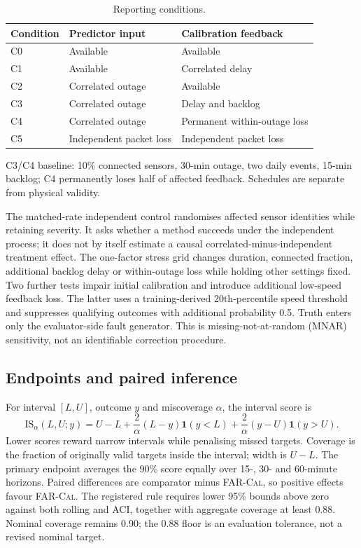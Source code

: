 \documentclass[pdflatex,sn-mathphys-num]{sn-jnl}
\newcommand{\FAR}{\textsc{FAR-Cal}}
\begin{document}
\begin{table}[!htbp]
\caption{Reporting conditions.}\label{tab:conditions}
\centering\setlength{\tabcolsep}{3pt}\small
\begin{tabular}{lll}\toprule
Condition & Predictor input & Calibration feedback \\\midrule
C0 & Available & Available \\
C1 & Available & Correlated delay \\
C2 & Correlated outage & Available \\
C3 & Correlated outage & Delay and backlog \\
C4 & Correlated outage & Permanent within-outage loss \\
C5 & Independent packet loss & Independent packet loss \\
\bottomrule\end{tabular}
\par\smallskip\footnotesize C3/C4 baseline: 10\% connected sensors, 30-min outage, two daily events, 15-min backlog; C4 permanently loses half of affected feedback. Schedules are separate from physical validity.
\end{table}
\FloatBarrier

The matched-rate independent control randomises affected sensor identities while retaining severity. It asks whether a method succeeds under the independent process; it does not by itself estimate a causal correlated-minus-independent treatment effect. The one-factor stress grid changes duration, connected fraction, additional backlog delay or within-outage loss while holding other settings fixed. Two further tests impair initial calibration and introduce additional low-speed feedback loss. The latter uses a training-derived 20th-percentile speed threshold and suppresses qualifying outcomes with additional probability 0.5. Truth enters only the evaluator-side fault generator. This is missing-not-at-random (MNAR) sensitivity, not an identifiable correction procedure.

\subsection{Endpoints and paired inference}
For interval $[L,U]$, outcome $y$ and miscoverage $\alpha$, the interval score \citep{gneiting2007} is
\begin{equation}
\mathrm{IS}_{\alpha}(L,U;y)=U-L+\frac{2}{\alpha}(L-y)\mathbf1(y<L)+\frac{2}{\alpha}(y-U)\mathbf1(y>U).
\end{equation}
Lower scores reward narrow intervals while penalising missed targets. Coverage is the fraction of originally valid targets inside the interval; width is $U-L$. The primary endpoint averages the 90\% score equally over 15-, 30- and 60-minute horizons. Paired differences are comparator minus \FAR{}, so positive effects favour \FAR{}. The registered rule requires lower 95\% bounds above zero against both rolling and ACI, together with aggregate coverage at least 0.88. Nominal coverage remains 0.90; the 0.88 floor is an evaluation tolerance, not a revised nominal target.
\end{document}
